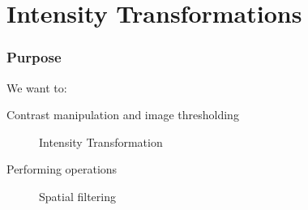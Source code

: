 \documentclass[notheorems, serif, table, compress]{beamer}  %
\begin{document}
\section{Intensity Transformations }



\begin{frame}[fragile]
\frametitle{Purpose}

We want to:

\begin{description}
\item [Contrast manipulation and image thresholding]Intensity Transformation %
\item [Performing operations]Spatial filtering %
\end{description}
\end{frame}
\end{document}
